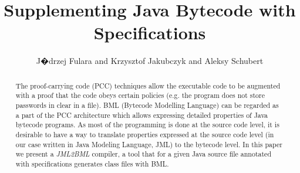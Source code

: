 \documentclass{llncs}
\author{
J�drzej Fulara and
Krzysztof Jakubczyk and
Aleksy Schubert
}
\title{Supplementing Java Bytecode with Specifications}
\institute{%
Institute of Informatics\\
University of Warsaw\\
ul. Banacha 2\\
02-097 Warsaw, Poland}
\newcommand{\jmltobmltext}{JML2BML}
\newcommand{\jmltobml}{\textsl{\jmltobmltext}\xspace}
\begin{document}
\maketitle



\begin{abstract}
  The proof-carrying code (PCC) techniques allow the executable code
  to be augmented with a proof that the code obeys certain policies
  (e.g. the program does not store passwords in clear in a file). BML
  (Bytecode Modelling Language) can be regarded as a part of the PCC
  architecture which allows expressing detailed properties of Java
  bytecode programs.  As most of the programming is done at the source
  code level, it is desirable to have a way to translate properties
  expressed at the source code level (in our case written in Java
  Modeling Language, JML) to the bytecode level.  In this paper we
  present a \jmltobml compiler, a tool that for a given Java source
  file annotated with specifications generates class files with BML.
\end{abstract}
\end{document}
